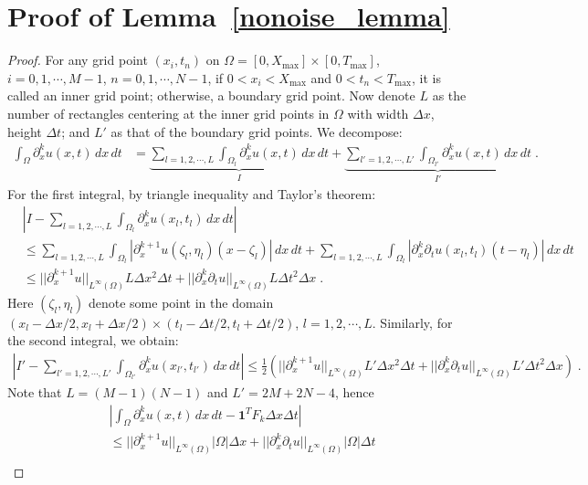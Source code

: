 \documentclass[a4paper,11pt]{article}
\theoremstyle{definition}
\begin{document}
\section{Proof of Lemma~\ref{nonoise_lemma}}\label{proof_nonoise_lemma}
\begin{proof}
For any grid point $(x_i,t_n)$ on $\Omega=[0,X_{\max}]\times[0,T_{\max}]$, $i=0,1,\cdots,M-1$, $n=0,1,\cdots,N-1$, if $0<x_i<X_{\max}$ and $0<t_n<T_{\max}$, it is called an inner grid point; otherwise, a boundary grid point. Now denote $L$ as the number of rectangles centering at the inner grid points in $\Omega$ with width $\Delta x$, height $\Delta t$; and $L'$ as that of the boundary grid points. We decompose:
\begin{align*}
\int_\Omega \partial_x^ku(x,t)\,dx\,dt&=\underbrace{\sum_{l=1,2,\cdots,L}\int_{\Omega_l}\partial_x^ku(x,t)\,dx\,dt}_{I}+\underbrace{\sum_{l'=1,2,\cdots,L'}\int_{\Omega_{l'}}\partial_x^ku(x,t)\,dx\,dt}_{I'}\;.
\end{align*}
For the first integral, by triangle inequality and Taylor's theorem:
\begin{align*}
&\left|I-\sum_{l=1,2,\cdots,L}\int_{\Omega_l}\partial_x^ku(x_l,t_l)\,dx\,dt\right|\\
&\leq\sum_{l=1,2,\cdots,L}\int_{\Omega_l}|\partial_x^{k+1}u(\zeta_l,\eta_l)(x-\zeta_l)|\,dx\,dt+\sum_{l=1,2,\cdots,L}\int_{\Omega_l}|\partial_x^k\partial_tu(x_l,t_l)(t-\eta_l)|\,dx\,dt\\
&\leq ||\partial_x^{k+1}u||_{L^\infty(\Omega)}L\Delta x^2\Delta t+||\partial_x^{k}\partial_tu||_{L^\infty(\Omega)}L\Delta t^2\Delta x\;.
\end{align*}
Here $(\zeta_l,\eta_l)$ denote some point in the domain $(x_l-\Delta x/2,x_l+\Delta x/2)\times (t_l-\Delta t/2,t_l+\Delta t/2)$, $l=1,2,\cdots,L$. Similarly, for the second integral, we obtain:
\begin{align*}
\left|I'-\sum_{l'=1,2,\cdots,L'}\int_{\Omega_{l'}}\partial_x^ku(x_{l'},t_{l'})\,dx\,dt \right|
\leq \frac{1}{2}(||\partial_x^{k+1}u||_{L^\infty(\Omega)}L'\Delta x^2\Delta t+||\partial_x^{k}\partial_tu||_{L^\infty(\Omega)}L'\Delta t^2\Delta x)	\;.
\end{align*}
Note that $L=(M-1)(N-1)$ and $L'=2M+2N-4$, hence
\begin{align*}
&\left|\int_\Omega\partial_x^ku(x,t)\,dx\,dt-\mathbf{1}^TF_k\Delta x\Delta t\right|\\
&\leq ||\partial_x^{k+1}u||_{L^\infty(\Omega)}|\Omega|\Delta x+||\partial_x^{k}\partial_tu||_{L^\infty(\Omega)}|\Omega|\Delta t \\

\end{align*}
\end{proof}
\end{document}
